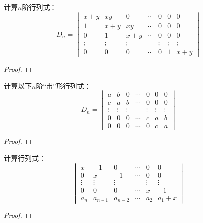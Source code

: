 \begin{problem}
计算\(n\)阶行列式：
\begin{equation*}
    D_n=
    \begin{vmatrix}
        x+y    & xy     & 0      & \cdots & 0      & 0      & 0      \\
        1      & x+y    & xy     & \cdots & 0      & 0      & 0      \\
        0      & 1      & x+y    & \cdots & 0      & 0      & 0      \\
        \vdots & \vdots & \vdots &        & \vdots & \vdots & \vdots \\
        0      & 0      & 0      & \cdots & 0      & 1      & x+y
    \end{vmatrix}
\end{equation*}
\end{problem}
\begin{proof}
\end{proof}

\begin{problem}
计算以下\(n\)阶“带”形行列式：
\begin{equation*}
    D_n=
    \begin{vmatrix}
        a      & b      & 0      & \cdots & 0      & 0      & 0      \\
        c      & a      & b      & \cdots & 0      & 0      & 0      \\
        \vdots & \vdots & \vdots &        & \vdots & \vdots & \vdots \\
        0      & 0      & 0      & \cdots & c      & a      & b      \\
        0      & 0      & 0      & \cdots & 0      & c      & a
    \end{vmatrix}
\end{equation*}
\end{problem}
\begin{proof}
\end{proof}

\begin{problem}
计算行列式：
\begin{equation*}
    \begin{vmatrix}
        x      & -1      & 0       & \cdots & 0      & 0      \\
        0      & x       & -1      & \cdots & 0      & 0      \\
        \vdots & \vdots  & \vdots  &        & \vdots & \vdots \\
        0      & 0       & 0       & \cdots & x      & -1     \\
        a_n    & a_{n-1} & a_{n-2} & \cdots & a_2    & a_1+x
    \end{vmatrix}
\end{equation*}
\end{problem}
\begin{proof}
\end{proof}

